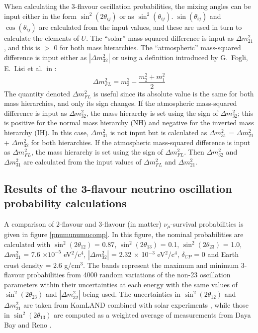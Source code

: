 When calculating the 3-flavour oscillation probabilities, the mixing angles can be input either in the form $\sin^{2}(2 \theta_{ij})$ 
or as $\sin^{2}(\theta_{ij})$. $\sin(\theta_{ij})$ and $\cos(\theta_{ij})$ are calculated from the input values, and these are used in 
turn to calculate the elements of $U$. The ``solar'' mass-squared difference is input as $\Delta m_{21}^{2}$, and this is $>$ 0 for 
both mass hierarchies. The ``atmospheric'' 
mass-squared difference is input either as $|\Delta m_{32}^{2}|$ or using a definition introduced by G.\ Fogli, E.\ Lisi et al.\ in 
\cite{LisiGlobalAnalysis}:
\begin{equation}
\Delta m^{2}_{FL} = m_{3}^{2} - \frac{m_{2}^{2} + m_{1}^{2}}{2}
\end{equation}
The quantity denoted $\Delta m^{2}_{FL}$ is useful since its absolute value is the same for both mass hierarchies, and only its sign 
changes. If the atmospheric mass-squared difference is input as $\Delta m^{2}_{32}$, the mass hierarchy is set using the sign of 
$\Delta m_{32}^{2}$; this is positive for the normal mass hierarchy (NH) and negative for the inverted mass hierarchy (IH). In this case, 
$\Delta m_{31}^{2}$ is not input but is calculated as $\Delta m_{31}^{2}$ = $\Delta m_{21}^{2}$ + $\Delta m_{32}^{2}$ for both hierarchies.
If the atmospheric mass-squared difference is input as $\Delta m^{2}_{FL}$, the mass hierarchy is set using the sign of $\Delta m^{2}_{FL}$. 
Then $\Delta m_{32}^{2}$ and $\Delta m_{31}^{2}$ are calculated from the input values of $\Delta m^{2}_{FL}$ and $\Delta m_{21}^{2}$.

\subsection{Results of the 3-flavour neutrino oscillation probability calculations}
\label{sec:3flavourresults}

A comparison of 2-flavour and 3-flavour (in matter) $\nu_{\mu}$-survival probabilities is given in figure \ref{pnumunumucomp}. 
In this figure, the nominal probabilities are calculated with $\sin^{2}(2 \theta_{12})$ = 0.87, $\sin^{2}(2 \theta_{13})$ = 0.1,
$\sin^{2}(2 \theta_{23})$ = 1.0, $\Delta m_{21}^{2}$ = 7.6 $\times 10^{-5}$  eV$^{2}$/c$^{4}$, $|\Delta m_{32}^{2}|$ = 2.32 $\times$ 10$^{-3}$ eV$^{2}$/c$^{4}$,
$\delta_{CP}$ = 0 and Earth crust density = 2.6 g/cm$^{3}$. The bands represent the maximum and minimum 3-flavour probabilities from 4000 random
variations of the non-23 oscillation parameters within their uncertainties at each energy with the same values of $\sin^{2}(2 \theta_{23})$ and
$|\Delta m_{32}^{2}|$ being used. The uncertainties in $\sin^{2}(2 \theta_{12})$ and $\Delta m_{21}^{2}$ are taken from KamLAND combined
with solar experiments \cite{Kamland}, while those in $\sin^{2}(2 \theta_{13})$ are computed as a weighted average of measurements from Daya Bay
\cite{DayaBay} and Reno \cite{Reno}.

